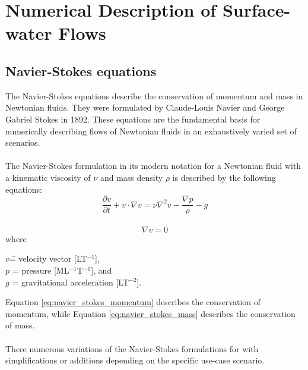 \section{Numerical Description of Surface-water Flows}

\subsection{Navier-Stokes equations}
The Navier-Stokes equations describe the conservation of momentum and mass in Newtonian fluids. They were formulated by Claude-Louis Navier and George Gabriel Stokes in 1892. These equations are the fundamental basis for numerically describing flows of Newtonian fluids in an exhaustively varied set of scenarios.
\\ \\
The Navier-Stokes formulation in its modern notation for a Newtonian fluid with a kinematic viscosity of $\nu$ and mass density $\rho$ is described by the following equations:
\begin{equation} \label{eq:navier_stokes_momentum}
    {\frac {\partial v}{\partial t}} + {v \cdot \nabla v} = {\nu \nabla^2 v} - {\frac {\nabla p}{ \rho }} - g
\end{equation}
\\
\begin{equation} \label{eq:navier_stokes_mass}
    {\nabla v} = 0
\end{equation}
where
\begin{tabbing}
    $v$\hspace{.4in}\= = velocity vector [LT$^{-1}$],\\
    $p$ \>= pressure [ML$^{-1}$T$^{-1}$], and \\
    $g$ \>= gravitational acceleration [LT$^{-2}$].
\end{tabbing}
Equation \ref{eq:navier_stokes_momentum} describes the conservation of momentum, while Equation \ref{eq:navier_stokes_mass} describes the conservation of mass.
\\ \\
There numerous variations of the Navier-Stokes formulations for with simplifications or additions depending on the specific use-case scenario. 

